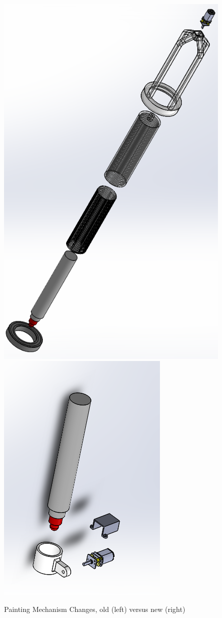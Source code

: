 \begin{figure}[h!]
\centering
\includegraphics[width=0.4\columnwidth]{CAD/painting_old.PNG}
\includegraphics[width=0.4\columnwidth]{CAD/painting_new.PNG}
\label{fig:em2}
\caption{Painting Mechanism Changes, old (left) versus new (right)}
\end{figure}
